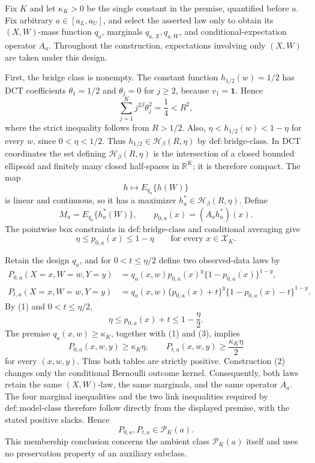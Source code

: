Fix \(K\) and let \(\kappa_K>0\) be the single constant in the premise, quantified before \(a\). Fix arbitrary \(a\in[a_L,a_U]\), and select the asserted law only to obtain its \((X,W)\)-mass function \(q_a\), marginals \(q_{a,X},q_{a,W}\), and conditional-expectation operator \(A_a\). Throughout the construction, expectations involving only \((X,W)\) are taken under this design.

First, the bridge class is nonempty. The constant function \(h_{1/2}(w)=1/2\) has DCT coefficients \(\theta_1=1/2\) and \(\theta_j=0\) for \(j\ge2\), because \(v_1=\mathbf 1\). Hence
\[
\sum_{j=1}^K j^{2\beta}\theta_j^2=\frac14<R^2,
\]
where the strict inequality follows from \(R>1/2\). Also, \(\eta<h_{1/2}(w)<1-\eta\) for every \(w\), since \(0<\eta<1/2\). Thus \(h_{1/2}\in\mathcal H_\beta(R,\eta)\) by \(\mathrm{def:bridge\mbox{-}class}\). In DCT coordinates the set defining \(\mathcal H_\beta(R,\eta)\) is the intersection of a closed bounded ellipsoid and finitely many closed half-spaces in \(\mathbb R^K\); it is therefore compact. The map
\[
h\longmapsto E_{q_a}\{h(W)\}
\]
is linear and continuous, so it has a maximizer \(h_a^*\in\mathcal H_\beta(R,\eta)\). Define
\[
M_a=E_{q_a}\{h_a^*(W)\},
\qquad
p_{0,a}(x)=(A_a h_a^*)(x).
\]
The pointwise box constraints in \(\mathrm{def:bridge\mbox{-}class}\) and conditional averaging give
\[
\eta\le p_{0,a}(x)\le1-\eta
\qquad\text{for every }x\in\mathcal X_K. \tag{1}
\]

Retain the design \(q_a\), and for \(0<t\le\eta/2\) define two observed-data laws by
\[
\begin{aligned}
P_{0,a}(X=x,W=w,Y=y)
&=q_a(x,w)p_{0,a}(x)^y\{1-p_{0,a}(x)\}^{1-y},\\
P_{t,a}(X=x,W=w,Y=y)
&=q_a(x,w)\{p_{0,a}(x)+t\}^y
  \{1-p_{0,a}(x)-t\}^{1-y}.
\end{aligned} \tag{2}
\]
By (1) and \(0<t\le\eta/2\),
\[
\eta\le p_{0,a}(x)+t\le1-\frac\eta2. \tag{3}
\]
The premise \(q_a(x,w)\ge\kappa_K\), together with (1) and (3), implies
\[
P_{0,a}(x,w,y)\ge\kappa_K\eta,
\qquad
P_{t,a}(x,w,y)\ge\frac{\kappa_K\eta}{2} \tag{4}
\]
for every \((x,w,y)\). Thus both tables are strictly positive. Construction (2) changes only the conditional Bernoulli outcome kernel. Consequently, both laws retain the same \((X,W)\)-law, the same marginals, and the same operator \(A_a\). The four marginal inequalities and the two link inequalities required by \(\mathrm{def:model\mbox{-}class}\) therefore follow directly from the displayed premise, with the stated positive slacks. Hence
\[
P_{0,a},P_{t,a}\in\mathcal P_K(a). \tag{5}
\]
This membership conclusion concerns the ambient class \(\mathcal P_K(a)\) itself and uses no preservation property of an auxiliary subclass.

